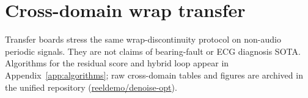 \section{Cross-domain wrap transfer}
\label{app:transfer-bundle}

Transfer boards stress the same wrap-discontinuity protocol on non-audio periodic signals.
They are not claims of bearing-fault or ECG diagnosis SOTA.
Algorithms for the residual score and hybrid loop appear in Appendix~\ref{app:algorithms}; raw cross-domain tables and figures are archived in the unified repository (\href{https://github.com/reeldemo/denoise-opt}{reeldemo/denoise-opt}).



